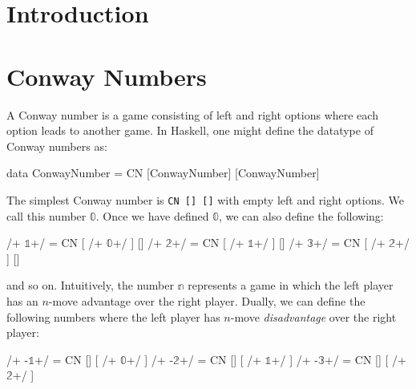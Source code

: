 \documentclass[authoryear,preprint]{sigplanconf}
\newcommand{\zerog}{$\mathbb{0}$}
\newcommand{\oneg}{$\mathbb{1}$}
\newcommand{\twog}{$\mathbb{2}$}
\newcommand{\threeg}{$\mathbb{3}$}
\begin{document}
\begin{abstract}
\ldots
\end{abstract}

\section{Introduction}

\section{Conway Numbers}

A Conway number is a game consisting of left and right options where each
option leads to another game. In Haskell, one might define the datatype of
Conway numbers as:
\begin{code}
data ConwayNumber = CN [ConwayNumber] [ConwayNumber]
\end{code}
The simplest Conway number is \lstinline|CN [] []| with empty left and right
options. We call this number \zerog. Once we have defined \zerog, we can also
define the following:
\begin{code}
/+ \oneg +/  = CN  [ /+ \zerog +/ ]  []
/+ \twog +/  = CN  [ /+ \oneg +/ ]  []
/+ \threeg +/  = CN  [ /+ \twog +/ ]  []
\end{code}
and so on. Intuitively, the number $\mathbb{n}$ represents a game in which
the left player has an $n$-move advantage over the right player. Dually, we
can define the following numbers where the left player has $n$-move
\emph{disadvantage} over the right player:
\begin{code}
/+ -\oneg +/  = CN  [] [ /+ \zerog +/ ]
/+ -\twog +/  = CN  [] [ /+ \oneg +/ ]
/+ -\threeg +/  = CN  [] [ /+ \twog +/ ]
\end{code}


\softraggedright

\end{document}
